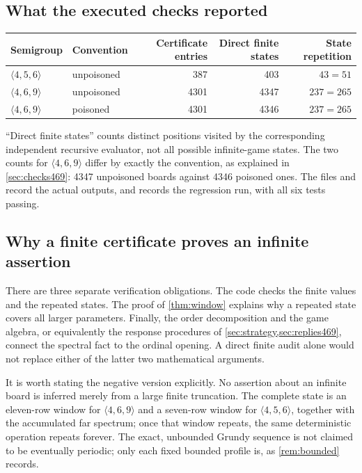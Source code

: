 \documentclass[11pt,letterpaper]{article}
\numberwithin{equation}{section}
\theoremstyle{definition}
\theoremstyle{remark}
\begin{document}
\subsection{What the executed checks reported}

\begin{center}
\begin{tabular}{llrrr}
\toprule
Semigroup & Convention & Certificate entries & Direct finite states
 & State repetition\\
\midrule
$\langle4,5,6\rangle$ & unpoisoned & 387 & 403 & $43=51$\\
$\langle4,6,9\rangle$ & unpoisoned & 4301 & 4347 & $237=265$\\
$\langle4,6,9\rangle$ & poisoned & 4301 & 4346 & $237=265$\\
\bottomrule
\end{tabular}
\end{center}
``Direct finite states'' counts distinct positions visited by the
corresponding independent recursive evaluator, not all possible
infinite-game states. The two counts for $\langle4,6,9\rangle$ differ by
exactly the convention, as explained in \cref{sec:checks469}: 4347
unpoisoned boards against 4346 poisoned ones. The files
 and  record the
actual outputs, and  records the
regression run, with all six tests passing.

\subsection{Why a finite certificate proves an infinite assertion}

There are three separate verification obligations. The code checks the
finite values and the repeated states. The proof of \cref{thm:window}
explains why a repeated state covers all larger parameters. Finally, the
order decomposition and the game algebra, or equivalently the response
procedures of \cref{sec:strategy,sec:replies469}, connect the spectral
fact to the ordinal opening. A direct finite audit alone would not
replace either of the latter two mathematical arguments.

It is worth stating the negative version explicitly. No assertion about
an infinite board is inferred merely from a large finite truncation. The
complete state is an eleven-row window for $\langle4,6,9\rangle$ and a
seven-row window for $\langle4,5,6\rangle$, together with the accumulated
far spectrum; once that window repeats, the same deterministic operation
repeats forever. The exact, unbounded Grundy sequence is not claimed to
be eventually periodic; only each fixed bounded profile is, as
\cref{rem:bounded} records.
\end{document}
